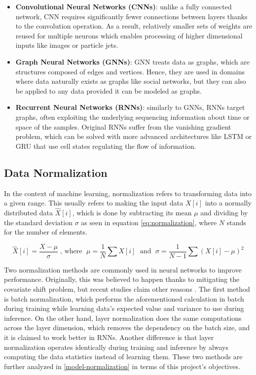 \begin{itemize}
  \item \textbf{Convolutional Neural Networks (CNNs)}: unlike a fully connected network, CNN requires significantly fewer connections between layers thanks to the convolution operation. As a result, relatively smaller sets of weights are reused for multiple neurons which enables processing of higher dimensional inputs like images or particle jets.
  \item \textbf{Graph Neural Networks (GNNs)}: GNN treats data as graphs, which are structures composed of edges and vertices. Hence, they are used in domains where data naturally exists as graphs like social networks, but they can also be applied to any data provided it can be modeled as graphs.
  \item \textbf{Recurrent Neural Networks (RNNs)}: similarly to GNNs, RNNs target graphs, often exploiting the underlying sequencing information about time or space of the samples. Original RNNs suffer from the vanishing gradient problem, which can be solved with more advanced architectures like LSTM \cite{88-hochreiter1997long} or GRU \cite{89-cho2014properties} that use cell states regulating the flow of information.
\end{itemize}

\subsection{Data Normalization}\label{data-normalization}
In the context of machine learning, normalization refers to transforming data into a given range. This usually refers to making the input data \(X[i]\) into a normally distributed data \(\hat{X}[i]\), which is done by subtracting its mean \(\mu\) and dividing by the standard deviation \(\sigma\) as seen in equation \ref{eq:normalization}, where \(N\) stands for the number of elements.

\begin{equation}\label{eq:normalization}
  \hat{X}[i] = \frac{X - \mu}{\sigma} \; \text{, where } \; \mu = \frac{1}{N} \sum X[i] \; \text{ and } \; \sigma = \frac{1}{N-1} \sum ( X[i] - \mu )^2
\end{equation}

Two normalization methods are commonly used in neural networks to improve performance. Originally, this was believed to happen thanks to mitigating the covariate shift problem, but recent studies claim other reasons \cite{90-santurkar2018batch}. The first method is batch normalization, which performs the aforementioned calculation in batch during training while learning data's expected value and variance to use during inference. On the other hand, layer normalization \cite{51-ba2016layer} does the same computations across the layer dimension, which removes the dependency on the batch size, and it is claimed to work better in RNNs. Another difference is that layer normalization operates identically during training and inference by always computing the data statistics instead of learning them. These two methods are further analyzed in \cref{model-normalization} in terms of this project's objectives.

